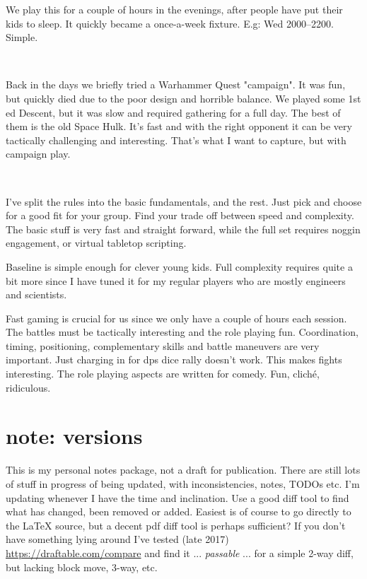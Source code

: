 We play this for a couple of hours in the evenings, after people have put their kids to sleep. It quickly became a once-a-week fixture. E.g: Wed 2000--2200. Simple.

\

Back in the days we briefly tried a Warhammer Quest "campaign". It was fun, but quickly died due to the poor design and horrible balance. We played some 1st ed Descent, but it was slow and required gathering for a full day. The best of them is the old Space Hulk. It's fast and with the right opponent it can be very tactically challenging and interesting. That's what I want to capture, but with campaign play.


\

I've split the rules into the basic fundamentals, and the rest. Just pick and choose for a good fit for your group. Find your trade off between speed and complexity. The basic stuff is very fast and straight forward, while the full set requires noggin engagement, or virtual tabletop scripting.

Baseline is simple enough for clever young kids. Full complexity requires quite a bit more since I have tuned it for my regular players who are mostly engineers and scientists.

Fast gaming is crucial for us since we only have a couple of hours each session. The battles must be tactically interesting and the role playing fun. Coordination, timing, positioning, complementary skills and battle maneuvers are very important. Just charging in for dps dice rally doesn't work. This makes fights interesting. The role playing aspects are written for comedy. Fun, cliché, ridiculous.



\clearpage
\thispagestyle{empty}
\section*{note: versions}
This is my personal notes package, not a draft for publication. There are still lots of stuff in progress of being updated, with inconsistencies, notes, TODOs etc.
I'm updating whenever I have the time and inclination. Use a good diff tool to find what has changed, been removed or added. Easiest is of course to go directly to the \LaTeX{} source, but a decent pdf diff tool is perhaps sufficient? If you don't have something lying around I've tested
\vvsmall(late 2017)\normalsize~
\url{https://draftable.com/compare}
and find it ... \emph{passable} ... for a simple 2-way diff, but lacking block move, 3-way, etc.


